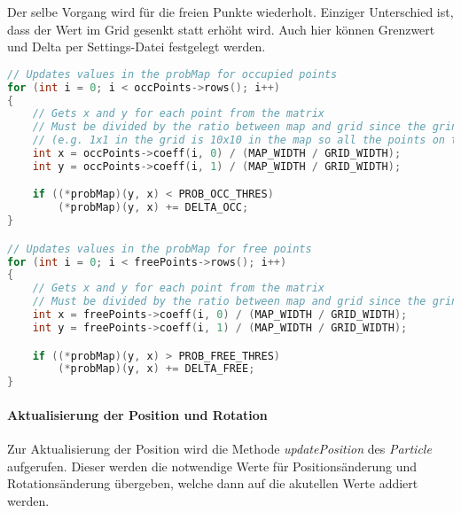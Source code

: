 Der selbe Vorgang wird für die freien Punkte wiederholt.
Einziger Unterschied ist, dass der Wert im Grid gesenkt statt erhöht wird.
Auch hier können Grenzwert und Delta per Settings-Datei festgelegt werden.

\begin{lstlisting}[caption={Auschnitt aus updateProbMap},label={lst:update-prob-map},language={C++}]
// Updates values in the probMap for occupied points
for (int i = 0; i < occPoints->rows(); i++)
{
    // Gets x and y for each point from the matrix
    // Must be divided by the ratio between map and grid since the grind is a fraction of the size to allow for some error
    // (e.g. 1x1 in the grid is 10x10 in the map so all the points on the map that lay in this 10x10 area will change the value of probability at that single point in the grid)
    int x = occPoints->coeff(i, 0) / (MAP_WIDTH / GRID_WIDTH);
    int y = occPoints->coeff(i, 1) / (MAP_WIDTH / GRID_WIDTH);

    if ((*probMap)(y, x) < PROB_OCC_THRES)
        (*probMap)(y, x) += DELTA_OCC;
}

// Updates values in the probMap for free points
for (int i = 0; i < freePoints->rows(); i++)
{
    // Gets x and y for each point from the matrix
    // Must be divided by the ratio between map and grid since the grind is a fraction of the size to allow for some error
    int x = freePoints->coeff(i, 0) / (MAP_WIDTH / GRID_WIDTH);
    int y = freePoints->coeff(i, 1) / (MAP_WIDTH / GRID_WIDTH);

    if ((*probMap)(y, x) > PROB_FREE_THRES)
        (*probMap)(y, x) += DELTA_FREE;
}
\end{lstlisting}

\paragraph{Aktualisierung der Position und Rotation}
\label{position_update}Zur Aktualisierung der Position wird die Methode \textit{updatePosition} des \textit{Particle} aufgerufen.
Dieser werden die notwendige Werte für Positionsänderung und Rotationsänderung übergeben, welche dann auf die akutellen Werte addiert werden.

